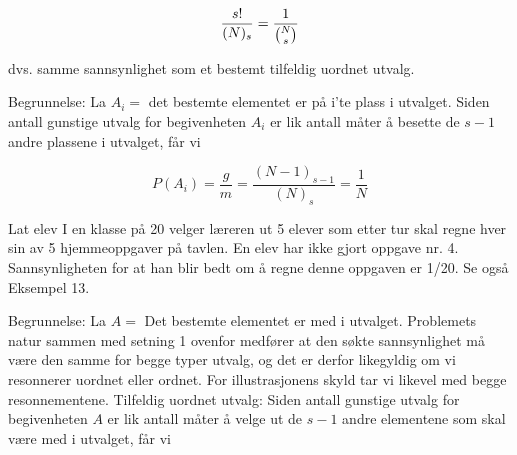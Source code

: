 \[\frac{s!}{(N)_s}=\frac{1}{{{N}\choose{s}}} \]

\noindent dvs. samme sannsynlighet som et bestemt tilfeldig uordnet utvalg.
          
\begin{center}  \end{center}
\noindent Begrunnelse: La $A_i=$ det bestemte elementet er på i'te plass i
utvalget. Siden antall gunstige utvalg for begivenheten $A_i$ er
lik antall måter å besette de $s-1$ andre plassene i utvalget, får
vi

\[ P(A_i)=\frac{g}{m}=\frac{(N-1)_{s-1}}{(N)_s}=\frac{1}{N} \]

\begin{eksempel}{Lat elev}
I en klasse på 20 velger læreren ut 5 elever som etter tur skal
regne hver sin av 5 hjemmeoppgaver på tavlen. En elev har ikke
gjort oppgave nr. 4. Sannsynligheten for at han blir bedt om å
regne denne oppgaven er 1/20. Se også Eksempel 13.
\end{eksempel}

\begin{center}  \end{center}

\noindent Begrunnelse: La $A=$ Det bestemte elementet er med i utvalget.
Problemets natur sammen med setning 1 ovenfor medfører at den
søkte sannsynlighet må være den samme for begge typer utvalg, og
det er derfor likegyldig om vi resonnerer uordnet eller ordnet.
For illustrasjonens skyld tar vi likevel med begge
resonnementene. Tilfeldig uordnet utvalg: Siden antall gunstige
utvalg for begivenheten $A$ er lik antall måter å velge ut de 
$s-1$ andre elementene som skal være med i utvalget, får vi

